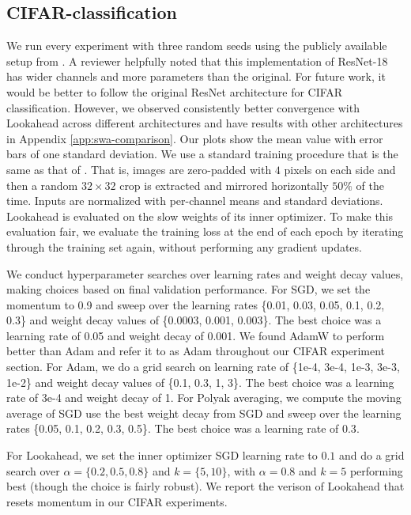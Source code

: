 \documentclass{article}
\begin{document}
\subsection{CIFAR-classification}
We run every experiment with three random seeds using the publicly available setup from \citep{devries2017improved}. A reviewer helpfully noted that this implementation of ResNet-18 has wider channels and more parameters than the original. For future work, it would be better to follow the original ResNet architecture for CIFAR classification. However, we observed consistently better convergence with Lookahead across different architectures and have results with other architectures in Appendix \ref{app:swa-comparison}. Our plots show the mean value with error bars of one standard deviation. We use a standard training procedure that is the same as that of \citet{Zagoruyko2016WRN}. That is, images are zero-padded with $4$ pixels on each side and then a random $32 \times 32$ crop is extracted and mirrored horizontally $50\%$ of the time. Inputs are normalized with per-channel means and standard deviations. Lookahead is evaluated on the slow weights of its inner optimizer. To make this evaluation fair, we evaluate the training loss at the end of each epoch by iterating through the training set again, without performing any gradient updates.

We conduct hyperparameter searches over learning rates and weight decay values, making choices based on final validation performance. For SGD, we set the momentum to 0.9 and sweep over the learning rates \{0.01, 0.03, 0.05, 0.1, 0.2, 0.3\} and weight decay values of \{0.0003, 0.001, 0.003\}. The best choice was a learning rate of 0.05 and weight decay of 0.001. We found AdamW \citep{loshchilov2017fixing} to perform better than Adam and refer it to as Adam throughout our CIFAR experiment section. For Adam, we do a grid search on learning rate of \{1e-4, 3e-4, 1e-3, 3e-3, 1e-2\} and weight decay values of \{0.1, 0.3, 1, 3\}. The best choice was a learning rate of 3e-4 and weight decay of 1. For Polyak averaging, we compute the moving average of SGD use the best weight decay from SGD and sweep over the learning rates \{0.05, 0.1, 0.2, 0.3, 0.5\}. The best choice was a learning rate of $0.3$.

For Lookahead, we set the inner optimizer SGD learning rate to $0.1$ and do a grid search over $\alpha = \{0.2, 0.5, 0.8\}$ and $k = \{5, 10\}$, with $\alpha=0.8$ and $k=5$ performing best (though the choice is fairly robust). We report the verison of Lookahead that resets momentum in our CIFAR experiments. 
\end{document}
